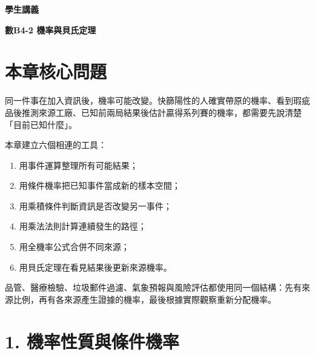 \documentclass[11pt,a4paper]{article}
\providecommand{\tightlist}{%
  \setlength{\itemsep}{0pt}\setlength{\parskip}{0pt}}
\begin{document}
\begin{tcolorbox}[
  enhanced,colback=white,colframe=HandoutBlue,boxrule=1.1pt,arc=2mm,
  borderline west={3pt}{0pt}{HandoutBlue},left=5mm,right=4mm,top=4mm,bottom=4mm
]
{\sffamily\small\bfseries\color{HandoutBlue}學生講義}\par
{\sffamily\bfseries\LARGE\color{HandoutInk}數B4-2 機率與貝氏定理}\par
\vspace{0.35em}{\large 用已知資訊縮小樣本空間，判斷事件是否獨立，並由新證據更新原先機率}\par
{}\par
{}\par
\end{tcolorbox}


\section{本章核心問題}\label{ux672cux7ae0ux6838ux5fc3ux554fux984c}

同一件事在加入資訊後，機率可能改變。快篩陽性的人確實帶原的機率、看到瑕疵品後推測來源工廠、已知前兩局結果後估計贏得系列賽的機率，都需要先說清楚「目前已知什麼」。

本章建立六個相連的工具：

\begin{enumerate}
\def\labelenumi{\arabic{enumi}.}
\tightlist
\item
  用事件運算整理所有可能結果；
\item
  用條件機率把已知事件當成新的樣本空間；
\item
  用乘積條件判斷資訊是否改變另一事件；
\item
  用乘法法則計算連續發生的路徑；
\item
  用全機率公式合併不同來源；
\item
  用貝氏定理在看見結果後更新來源機率。
\end{enumerate}

品管、醫療檢驗、垃圾郵件過濾、氣象預報與風險評估都使用同一個結構：先有來源比例，再有各來源產生證據的機率，最後根據實際觀察重新分配機率。

\section{1. 機率性質與條件機率}\label{ux6a5fux7387ux6027ux8ceaux8207ux689dux4ef6ux6a5fux7387}
\end{document}

